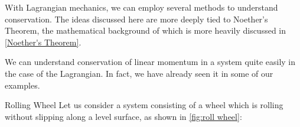 With \gls{Lagrangian} mechanics, we can employ several methods to understand conservation. The ideas discussed here are more deeply tied to Noether's Theorem, the mathematical background of which is more heavily discussed in \autoref{Noether's Theorem}.

We can understand conservation of linear momentum in a system quite easily in the case of the \gls{Lagrangian}. In fact, we have already seen it in some of our examples.

\begin{example}{Rolling Wheel}
Let us consider a system consisting of a wheel which is rolling without slipping along a level surface, as shown in \autoref{fig:roll wheel}:
\begin{figure}[H]
    \centering


\begin{tikzpicture}[x=0.75pt,y=0.75pt,yscale=-1,xscale=1]


\end{tikzpicture}
\end{figure}
\end{example}
